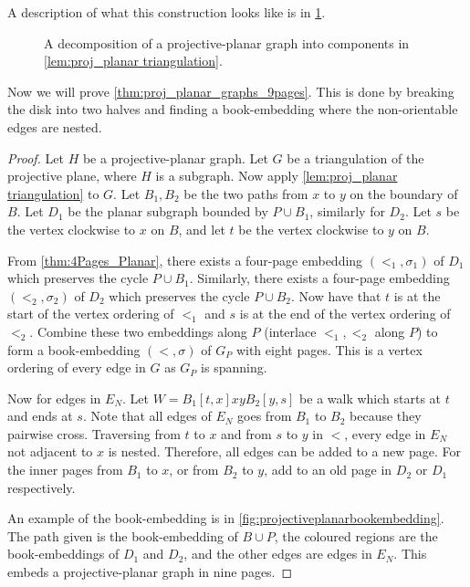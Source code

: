 A description of what this construction looks like is in \cref{fig:projectiveplanardecomp}.
\begin{figure}[h]
    \centering
    
    \caption[Projective-Planar decomposition]{A decomposition of a projective-planar graph into components in \cref{lem:proj_planar triangulation}.}\label{fig:projectiveplanardecomp}
\end{figure}

Now we will prove \cref{thm:proj_planar_graphs_9pages}. This is done by breaking the disk into two halves and finding a book-embedding where the non-orientable edges are nested.
\begin{proof}
    Let $H$ be a projective-planar graph. Let $G$ be a triangulation of the projective plane, where $H$ is a subgraph.
    Now apply \cref{lem:proj_planar triangulation} to $G$. Let $B_1, B_2$ be the two paths from $x$ to $y$ on the boundary of $B$. Let $D_1$ be the planar subgraph bounded by $P \cup B_1$, similarly for $D_2$. Let $s$ be the vertex clockwise to $x$ on $B$, and let $t$ be the vertex clockwise to $y$ on $B$.

    From \cref{thm:4Pages_Planar}, there exists a four-page embedding $(<_1, \sigma_1)$ of $D_1$ which preserves the cycle $P \cup B_1$. Similarly, there exists a four-page embedding $(<_2, \sigma_2)$ of $D_2$ which preserves the cycle $P \cup B_2$.
    Now have that $t$ is at the start of the vertex ordering of $<_1$ and $s$ is at the end of the vertex ordering of $<_2$. 
    Combine these two embeddings along $P$ (interlace $<_1, <_2$ along $P$) to form a book-embedding $(<, \sigma)$ of $G_P$ with eight pages. This is a vertex ordering of every edge in $G$ as $G_P$ is spanning. 

    Now for edges in $E_N$. Let $W = B_1[t, x] xy B_2[y, s]$ be a walk which starts at $t$ and ends at $s$. Note that all edges of $E_N$ goes from $B_1$ to $B_2$ because they pairwise cross. Traversing from $t$ to $x$ and from $s$ to $y$ in $<$, every edge in $E_N$ not adjacent to $x$ is nested. Therefore, all edges can be added to a new page. For the inner pages from $B_1$ to $x$, or from $B_2$ to $y$, add to an old page in $D_2$ or $D_1$ respectively. 

    An example of the book-embedding is in \cref{fig:projectiveplanarbookembedding}. The path given is the book-embedding of $B \cup P$, the coloured regions are the book-embeddings of $D_1$ and $D_2$, and the other edges are edges in $E_N$. 
    This embeds a projective-planar graph in nine pages.
\end{proof}



